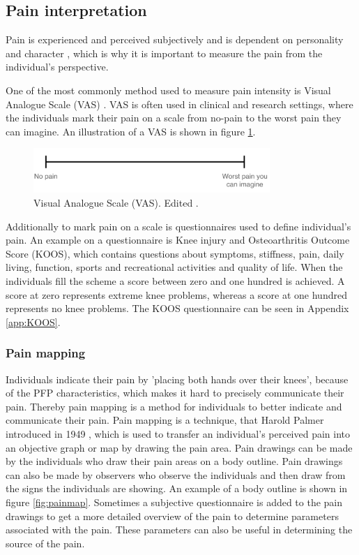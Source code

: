 \subsection{Pain interpretation}
Pain is experienced and perceived subjectively \citep{IASP2012, Younger2009} and is dependent on personality and character \citep{Schmidt2013}, which is why it is important to measure the pain from the individual’s perspective.
 
\noindent
One of the most commonly method used to measure pain intensity is Visual Analogue Scale (VAS) \citep{Valente2011}. VAS is often used in clinical and research settings, where the individuals mark their pain on a scale from no-pain to the worst pain they can imagine.\citep{Haefeli2005} An illustration of a VAS is shown in figure \ref{fig:VAS}.

\begin{figure} [H]
\centering
\includegraphics[width=0.8\textwidth]{figures/VAS}
\caption{Visual Analogue Scale (VAS). Edited \citep{Haefeli2005}.}
\label{fig:VAS}
\end{figure}

\noindent
Additionally to mark pain on a scale is questionnaires used to define individual's pain. An example on a questionnaire is Knee injury and Osteoarthritis Outcome Score (KOOS), which contains questions about symptoms, stiffness, pain, daily living, function, sports and recreational activities and quality of life. When the individuals fill the scheme a score between zero and one hundred is achieved. A score at zero represents extreme knee problems, whereas a score at one hundred represents no knee problems.\citep{Roos2003} The KOOS questionnaire can be seen in Appendix \ref{app:KOOS}. 
\noindent 


\subsubsection{Pain mapping}
Individuals indicate their pain by 'placing both hands over their knees', because of the PFP characteristics, which makes it hard to precisely communicate their pain. Thereby pain mapping is a method for individuals to better indicate and communicate their pain. 
\noindent
Pain mapping is a technique, that Harold Palmer introduced in 1949 \citep{Grunnesjo2006}, which is used to transfer an individual's perceived pain into an objective graph or map by drawing the pain area. Pain drawings can be made by the individuals who draw their pain areas on a body outline. Pain drawings can also be made by observers who observe the individuals and then draw from the signs the individuals are showing. An example of a body outline is shown in figure \ref{fig:painmap}. Sometimes a subjective questionnaire is added to the pain drawings to get a more detailed overview of the pain to determine parameters associated with the pain. These parameters can also be useful in determining the source of the pain.\citep{Schott2010}

